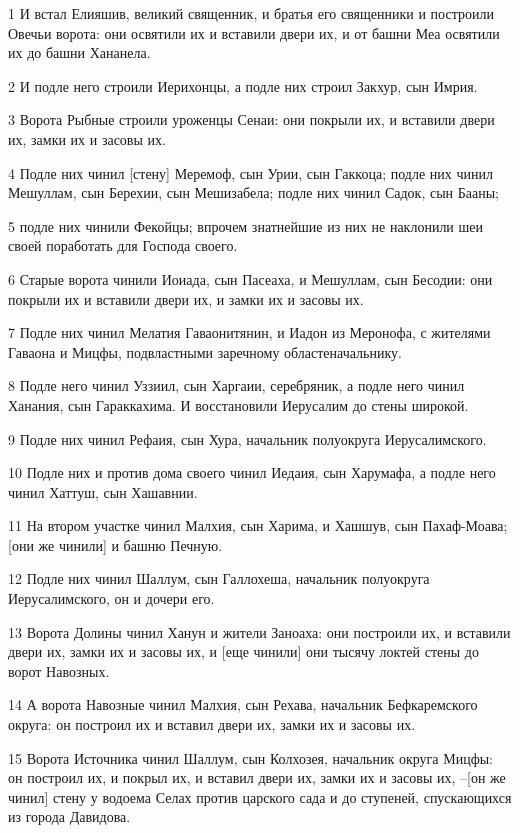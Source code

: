 \par 1 И встал Елияшив, великий священник, и братья его священники и построили Овечьи ворота: они освятили их и вставили двери их, и от башни Меа освятили их до башни Хананела.
\par 2 И подле него строили Иерихонцы, а подле них строил Закхур, сын Имрия.
\par 3 Ворота Рыбные строили уроженцы Сенаи: они покрыли их, и вставили двери их, замки их и засовы их.
\par 4 Подле них чинил [стену] Меремоф, сын Урии, сын Гаккоца; подле них чинил Мешуллам, сын Берехии, сын Мешизабела; подле них чинил Садок, сын Бааны;
\par 5 подле них чинили Фекойцы; впрочем знатнейшие из них не наклонили шеи своей поработать для Господа своего.
\par 6 Старые ворота чинили Иоиада, сын Пасеаха, и Мешуллам, сын Бесодии: они покрыли их и вставили двери их, и замки их и засовы их.
\par 7 Подле них чинил Мелатия Гаваонитянин, и Иадон из Меронофа, с жителями Гаваона и Мицфы, подвластными заречному областеначальнику.
\par 8 Подле него чинил Уззиил, сын Харгаии, серебряник, а подле него чинил Ханания, сын Гараккахима. И восстановили Иерусалим до стены широкой.
\par 9 Подле них чинил Рефаия, сын Хура, начальник полуокруга Иерусалимского.
\par 10 Подле них и против дома своего чинил Иедаия, сын Харумафа, а подле него чинил Хаттуш, сын Хашавнии.
\par 11 На втором участке чинил Малхия, сын Харима, и Хашшув, сын Пахаф-Моава; [они же чинили] и башню Печную.
\par 12 Подле них чинил Шаллум, сын Галлохеша, начальник полуокруга Иерусалимского, он и дочери его.
\par 13 Ворота Долины чинил Ханун и жители Заноаха: они построили их, и вставили двери их, замки их и засовы их, и [еще чинили] они тысячу локтей стены до ворот Навозных.
\par 14 А ворота Навозные чинил Малхия, сын Рехава, начальник Бефкаремского округа: он построил их и вставил двери их, замки их и засовы их.
\par 15 Ворота Источника чинил Шаллум, сын Колхозея, начальник округа Мицфы: он построил их, и покрыл их, и вставил двери их, замки их и засовы их, --[он же чинил] стену у водоема Селах против царского сада и до ступеней, спускающихся из города Давидова.
